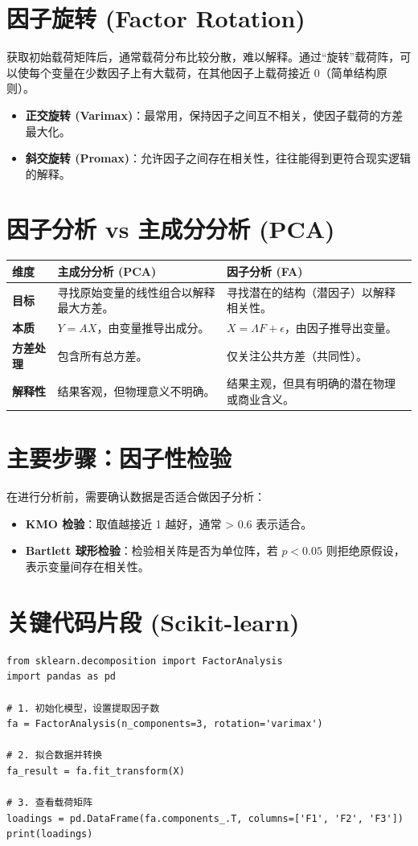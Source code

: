 \documentclass[12pt, a4paper]{article}
\begin{document}
\section{因子旋转 (Factor Rotation)}
获取初始载荷矩阵后，通常载荷分布比较分散，难以解释。通过“旋转”载荷阵，可以使每个变量在少数因子上有大载荷，在其他因子上载荷接近 0（简单结构原则）。
\begin{itemize}
    \item \textbf{正交旋转 (Varimax)}：最常用，保持因子之间互不相关，使因子载荷的方差最大化。
    \item \textbf{斜交旋转 (Promax)}：允许因子之间存在相关性，往往能得到更符合现实逻辑的解释。
\end{itemize}

\section{因子分析 vs 主成分分析 (PCA)}
\begin{table}[h]
\centering
\begin{tabularx}{\textwidth}{|l|X|X|}
\hline
\textbf{维度} & \textbf{主成分分析 (PCA)} & \textbf{因子分析 (FA)} \\
\hline
\textbf{目标} & 寻找原始变量的线性组合以解释最大方差。 & 寻找潜在的结构（潜因子）以解释相关性。 \\
\hline
\textbf{本质} & $Y = AX$，由变量推导出成分。 & $X = \Lambda F + \epsilon$，由因子推导出变量。 \\
\hline
\textbf{方差处理} & 包含所有总方差。 & 仅关注公共方差（共同性）。 \\
\hline
\textbf{解释性} & 结果客观，但物理意义不明确。 & 结果主观，但具有明确的潜在物理或商业含义。 \\
\hline
\end{tabularx}
\end{table}

\section{主要步骤：因子性检验}
在进行分析前，需要确认数据是否适合做因子分析：
\begin{itemize}
    \item \textbf{KMO 检验}：取值越接近 1 越好，通常 > 0.6 表示适合。
    \item \textbf{Bartlett 球形检验}：检验相关阵是否为单位阵，若 $p < 0.05$ 则拒绝原假设，表示变量间存在相关性。
\end{itemize}

\section{关键代码片段 (Scikit-learn)}
\begin{lstlisting}
from sklearn.decomposition import FactorAnalysis
import pandas as pd

# 1. 初始化模型，设置提取因子数
fa = FactorAnalysis(n_components=3, rotation='varimax')

# 2. 拟合数据并转换
fa_result = fa.fit_transform(X)

# 3. 查看载荷矩阵
loadings = pd.DataFrame(fa.components_.T, columns=['F1', 'F2', 'F3'])
print(loadings)
\end{lstlisting}
\end{document}
